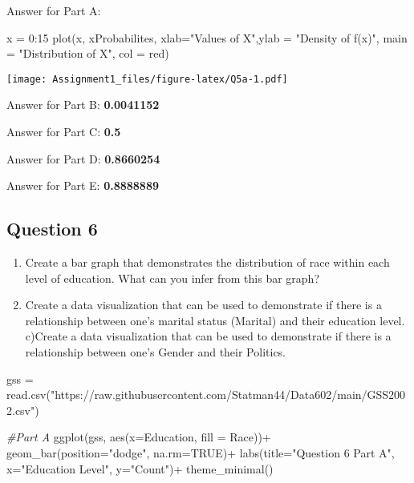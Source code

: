 \documentclass[
]{article}
\newenvironment{Shaded}{\begin{snugshade}}{\end{snugshade}}
\newcommand{\AttributeTok}[1]{\textcolor[rgb]{0.77,0.63,0.00}{#1}}
\newcommand{\CommentTok}[1]{\textcolor[rgb]{0.56,0.35,0.01}{\textit{#1}}}
\newcommand{\ConstantTok}[1]{\textcolor[rgb]{0.00,0.00,0.00}{#1}}
\newcommand{\DecValTok}[1]{\textcolor[rgb]{0.00,0.00,0.81}{#1}}
\newcommand{\FunctionTok}[1]{\textcolor[rgb]{0.00,0.00,0.00}{#1}}
\newcommand{\NormalTok}[1]{#1}
\newcommand{\OtherTok}[1]{\textcolor[rgb]{0.56,0.35,0.01}{#1}}
\newcommand{\SpecialCharTok}[1]{\textcolor[rgb]{0.00,0.00,0.00}{#1}}
\newcommand{\StringTok}[1]{\textcolor[rgb]{0.31,0.60,0.02}{#1}}
\providecommand{\tightlist}{%
  \setlength{\itemsep}{0pt}\setlength{\parskip}{0pt}}
\begin{document}
Answer for Part A:

\begin{Shaded}
\begin{Highlighting}[]
\NormalTok{x }\OtherTok{=} \DecValTok{0}\SpecialCharTok{:}\DecValTok{15}
\FunctionTok{plot}\NormalTok{(x, xProbabilites, }\AttributeTok{xlab=}\StringTok{"Values of X"}\NormalTok{,}\AttributeTok{ylab =} \StringTok{"Density of f(x)"}\NormalTok{, }\AttributeTok{main =} \StringTok{"Distribution of X"}\NormalTok{, }\AttributeTok{col =} \StringTok{\textquotesingle{}red\textquotesingle{}}\NormalTok{)}
\end{Highlighting}
\end{Shaded}

\texttt{[image: Assignment1\_files/figure-latex/Q5a-1.pdf]}

Answer for Part B: \textbf{0.0041152}

Answer for Part C: \textbf{0.5}

Answer for Part D: \textbf{0.8660254}

Answer for Part E: \textbf{0.8888889}

\hypertarget{question-6}{%
\subsection{Question 6}\label{question-6}}

\begin{enumerate}
\def\labelenumi{\alph{enumi})}
\tightlist
\item
  Create a bar graph that demonstrates the distribution of race within
  each level of education. What can you infer from this bar graph?
\item
  Create a data visualization that can be used to demonstrate if there
  is a relationship between one's marital status (Marital) and their
  education level. c)Create a data visualization that can be used to
  demonstrate if there is a relationship between one's Gender and their
  Politics.
\end{enumerate}

\begin{Shaded}
\begin{Highlighting}[]
\NormalTok{gss }\OtherTok{=} \FunctionTok{read.csv}\NormalTok{(}\StringTok{"https://raw.githubusercontent.com/Statman44/Data602/main/GSS2002.csv"}\NormalTok{)}

\CommentTok{\#Part A}
\FunctionTok{ggplot}\NormalTok{(gss, }\FunctionTok{aes}\NormalTok{(}\AttributeTok{x=}\NormalTok{Education, }\AttributeTok{fill =}\NormalTok{ Race))}\SpecialCharTok{+}
  \FunctionTok{geom\_bar}\NormalTok{(}\AttributeTok{position=}\StringTok{"dodge"}\NormalTok{, }\AttributeTok{na.rm=}\ConstantTok{TRUE}\NormalTok{)}\SpecialCharTok{+}
  \FunctionTok{labs}\NormalTok{(}\AttributeTok{title=}\StringTok{"Question 6 Part A"}\NormalTok{, }\AttributeTok{x=}\StringTok{"Education Level"}\NormalTok{, }\AttributeTok{y=}\StringTok{"Count"}\NormalTok{)}\SpecialCharTok{+}
  \FunctionTok{theme\_minimal}\NormalTok{()}
\end{Highlighting}
\end{Shaded}
\end{document}
